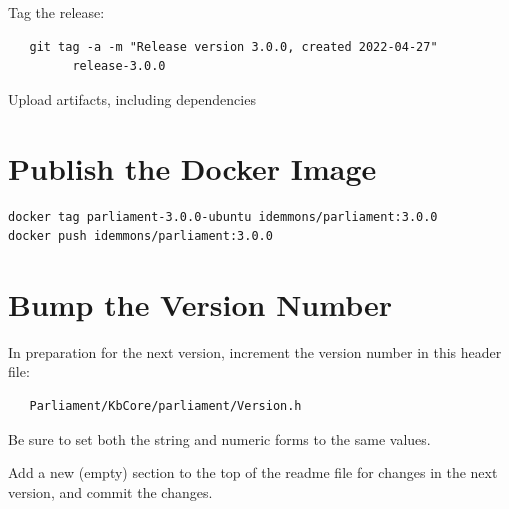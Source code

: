 \documentclass[12pt,letterpaper,draft]{article}
\begin{document}
Tag the release:

\begin{verbatim}
   git tag -a -m "Release version 3.0.0, created 2022-04-27"
         release-3.0.0
\end{verbatim}

Upload artifacts, including dependencies



\section{Publish the Docker Image}

\begin{verbatim}
docker tag parliament-3.0.0-ubuntu idemmons/parliament:3.0.0
docker push idemmons/parliament:3.0.0
\end{verbatim}



\section{Bump the Version Number}

In preparation for the next version, increment the version number in this header file:
\begin{verbatim}
   Parliament/KbCore/parliament/Version.h
\end{verbatim}
Be sure to set both the string and numeric forms to the same values.

Add a new (empty) section to the top of the readme file for changes in the next version, and commit the changes.
\end{document}
